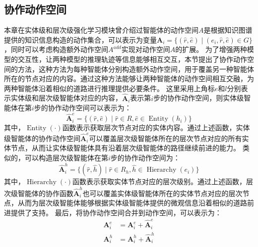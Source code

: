 \documentclass[algorithmlist, AutoFakeBold, AutoFakeSlant, figurelist, tablelist, nomlist, masters]{seuthesix}
\begin{document}
\subsection{协作动作空间}
本章在实体级和层次级强化学习模块曾介绍过智能体的动作空间$A$是根据知识图谱提供的知识信息构造的动作集合，可以表示为变量$\bm{A}_i = \{(\hat{r}, \hat{e}) \mid (e_i, \hat{r}, \hat{e}) \in G\}$，同时可以考虑构造额外动作空间$A^{add}$实现对动作空间$A$的扩展。
为了增强两种模型的交互性，让两种模型的推理轨迹等信息能够相互交互，本节提出了协作动作空间的方法，这种方法为每种智能体分别构造额外动作空间，用于覆盖另一种智能体所在的节点对应的内容。通过这种方法能够让两种智能体的动作空间相互交融，为两种智能体沿着相似的道路进行推理提供必要条件。
这里采用上角标$e$和$l$分别表示实体级和层次级智能体对应的内容，$\bm{\hat{A}}_i$表示第$i$步的协作动作空间，则实体级智能体在第$i$步的协作动作空间可以表示为：
\begin{equation}
  \bm{\hat{A}}_i^{e} = \{(\hat{r}, \hat{e}) \mid \hat{r} \in R, \hat{e} \in \operatorname{Entity}(h_i)\}
\end{equation}
其中，$\operatorname{Entity}(\cdot)$函数表示获取层次节点对应的实体内容。通过上述函数，实体级智能体的协作动作空间$\bm{\hat{A}}_i^{e}$可以覆盖层次级智能体所在的层次节点对应的所有实体节点，从而让实体级智能体具有沿着层次级智能体的路径继续前进的能力。
类似的，可以构造层次级智能体在第$i$步的协作动作空间为：
\begin{equation}
  \bm{\hat{A}}_i^{h} = \{(\hat{r}, \hat{h}) \mid \hat{r} \in R_h, \hat{h} \in \operatorname{Hierarchy}(e_i)\}
\end{equation}
其中，$\operatorname{Hierarchy}(\cdot)$函数表示获取实体节点对应的层次级别。通过上述函数，层次级智能体的协作函数$\bm{\hat{A}}_i^{h}$也可以覆盖实体级智能体所在的实体节点对应的层次节点，从而为层次级智能体能够根据实体级智能体提供的微观信息沿着相似的道路前进提供了支持。
最后，将协作动作空间合并到动作空间，可以表示为：
\begin{equation}
  \begin{aligned}
    \bm{A}_i^{e} &= \bm{A}_i^{e} + \bm{\hat{A}}_i^{e} \\
    \bm{A}_i^{h} &= \bm{A}_i^{h} + \bm{\hat{A}}_i^{h}
  \end{aligned}
\end{equation}
\end{document}
